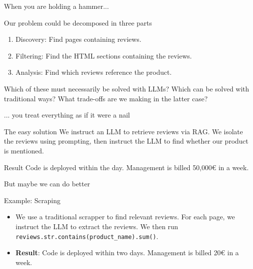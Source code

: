 \documentclass[24pt]{beamer}
\newcommand{\code}[1]{\texttt{#1}}
\begin{document}
\begin{frame}{When you are holding a hammer...}   	
	\begin{block}{Our problem could be decomposed in three parts}  		
		\begin{enumerate}
			\item Discovery: Find pages containing reviews.
			\item Filtering: Find the HTML sections containing the reviews.
			\item Analysis: Find which reviews reference the product.
		\end{enumerate}
	\end{block}
   	
	\begin{alertblock}{}
		Which of these must necessarily be solved with LLMs? Which can be solved with traditional ways? What trade-offs are we making in the latter case?
	\end{alertblock}
\end{frame}

\begin{frame}{... you treat everything as if it were a nail}
	\begin{block}{The easy solution}
		We instruct an LLM to retrieve reviews via RAG. We isolate the reviews using prompting, then instruct the LLM to find whether our product is mentioned.
	\end{block}
   	
	\begin{exampleblock}{Result}
		Code is deployed \alert{within the day}. Management is billed \alert{50,000\euro} in a week.
	\end{exampleblock}
\end{frame}

\begin{frame}{But maybe we can do better}
	\begin{exampleblock}{Example: Scraping}
		\begin{itemize}
			\item We use a traditional scrapper to find relevant reviews. For each page, we instruct the LLM to extract the reviews. We then run \code{reviews.str.contains(product\_name).sum()}.
			\item \textbf{Result}: Code is deployed within \alert{two days}. Management is billed \alert{20\euro} in a week.
		\end{itemize}	
	\end{exampleblock}
\end{frame}
\end{document}
